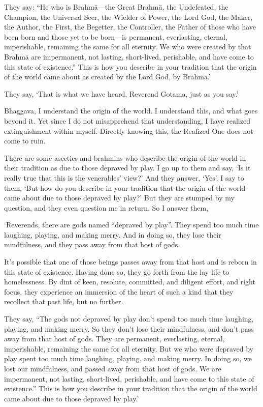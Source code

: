 \documentclass[12pt,openany]{book}%
\begin{document}
They say: “He who is \textsanskrit{Brahmā}—the Great \textsanskrit{Brahmā}, the Undefeated, the Champion, the Universal Seer, the Wielder of Power, the Lord God, the Maker, the Author, the First, the Begetter, the Controller, the Father of those who have been born and those yet to be born—is permanent, everlasting, eternal, imperishable, remaining the same for all eternity. We who were created by that \textsanskrit{Brahmā} are impermanent, not lasting, short-lived, perishable, and have come to this state of existence.” This is how you describe in your tradition that the origin of the world came about as created by the Lord God, by \textsanskrit{Brahmā}.’ 

They say, ‘That is what we have heard, Reverend Gotama, just as you say.’ 

Bhaggava, I understand the origin of the world. I understand this, and what goes beyond it. Yet since I do not misapprehend that understanding, I have realized extinguishment within myself. Directly knowing this, the Realized One does not come to ruin. 

There are some ascetics and brahmins who describe the origin of the world in their tradition as due to those depraved by play. I go up to them and say, ‘Is it really true that this is the venerables’ view?’ And they answer, ‘Yes’. I say to them, ‘But how do you describe in your tradition that the origin of the world came about due to those depraved by play?’ But they are stumped by my question, and they even question me in return. So I answer them, 

‘Reverends, there are gods named “depraved by play”. They spend too much time laughing, playing, and making merry. And in doing so, they lose their mindfulness, and they pass away from that host of gods. 

It’s possible that one of those beings passes away from that host and is reborn in this state of existence. Having done so, they go forth from the lay life to homelessness. By dint of keen, resolute, committed, and diligent effort, and right focus, they experience an immersion of the heart of such a kind that they recollect that past life, but no further. 

They say, “The gods not depraved by play don’t spend too much time laughing, playing, and making merry. So they don’t lose their mindfulness, and don’t pass away from that host of gods. They are permanent, everlasting, eternal, imperishable, remaining the same for all eternity. But we who were depraved by play spent too much time laughing, playing, and making merry. In doing so, we lost our mindfulness, and passed away from that host of gods. We are impermanent, not lasting, short-lived, perishable, and have come to this state of existence.” This is how you describe in your tradition that the origin of the world came about due to those depraved by play.’ 
\end{document}
